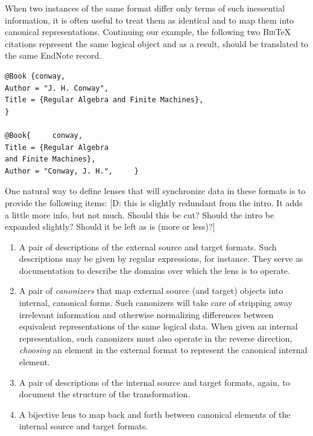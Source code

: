 \documentclass[acmsmall,review,anonymous]{acmart}
\newcommand{\FINISH}[3]{\ifdraft\textcolor{#1}{[#2: #3]}\fi}
\newcommand{\dpw}[1]{\FINISH{dkblue}{D}{#1}} %
\newcommand{\bibtex}{\textsc{Bib}\TeX{}}
\begin{document}
When two instances of the same format differ only terms of such inessential
information, it is often useful to treat them as identical and to map them
into canonical representations.
Continuing our example, the following two
\bibtex{} citations represent the same logical object and as a result, should
be translated to the same EndNote record.
\begin{verbatim}
@Book {conway,
Author = "J. H. Conway",
Title = {Regular Algebra and Finite Machines},
}

@Book{     conway,
Title = {Regular Algebra
and Finite Machines},
Author = "Conway, J. H.",     }
\end{verbatim}

One natural way to define lenses that will synchronize data in these formats
is to provide the following items: \dpw{this is slightly redundant from the intro.  It
adds a little more info, but not much.  Should this be cut?  Should the intro be expanded
slightly?  Should it be left as is (more or less)?}

\begin{enumerate}
  \item A pair of descriptions of the external source and target formats.
  Such descriptions may be given by regular expressions, for instance.
  They serve as documentation to describe the domains over which the lens
  is to operate.
  \item A pair of \emph{canonizers} that map external source (and target)
  objects into internal, canonical forms.  Such canonizers will take
  care of stripping away irrelevant information and otherwise normalizing
  differences between equivalent representations of the same logical data.
  When given an internal representation, such canonizers must also operate
  in the reverse direction, \emph{choosing} an element in the external format
  to represent the canonical internal element.
  \item A pair of descriptions of the internal source and
  target formats, again, to document the structure of the transformation.
  \item A bijective lens to map back and forth between canonical elements
  of the internal source and target formats.
\end{enumerate}
\end{document}
